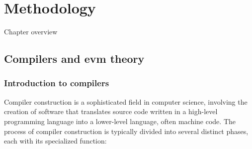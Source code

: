 \chapter{Methodology}
\label{chap:met}

Chapter overview

\section{Compilers and evm theory}
\label{}

\subsection{Introduction to compilers}

Compiler construction is a sophisticated field in computer science, involving the creation of software that translates source code written in a high-level programming language into a lower-level language, often machine code. The process of compiler construction is typically divided into several distinct phases, each with its specialized function:


